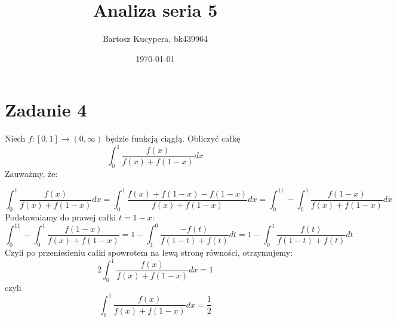 \documentclass{article}
\title{Analiza seria 5}
\author{Bartosz Kucypera, bk439964}
\date{\today}
\begin{document}
\maketitle

\section*{Zadanie 4}
Niech $f : [0,1] \to (0,\infty)$ będzie funkcją ciągłą. Obliczyć całkę
$$\int_0^1\frac{f(x)}{f(x)+f(1-x)}dx$$
Zauważmy, że:

$$\int_0^1\frac{f(x)}{f(x)+f(1-x)}dx = \int_0^1\frac{f(x) + f(1-x) - f(1-x)}{f(x) + f(1-x)}dx
= \int_0^11 - \int_0^1\frac{f(1-x)}{f(x)+f(1-x)}dx$$
Podstawaiamy do prawej całki $t=1-x$:
$$\int_0^11 - \int_0^1\frac{f(1-x)}{f(x)+f(1-x)} = 1 - \int_1^0\frac{-f(t)}{f(1-t)+f(t)}dt= 1 - \int_0^1\frac{f(t)}{f(1-t)+f(t)}dt$$
Czyli po przeniesieniu całki spowrotem na lewą stronę równości, otrzymujemy:
$$2\int_0^1\frac{f(x)}{f(x)+f(1-x)}dx = 1$$
czyli
$$\int_0^1\frac{f(x)}{f(x)+f(1-x)}dx = \frac{1}{2}$$
\end{document}
